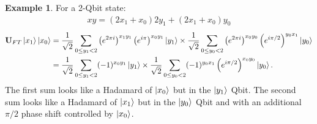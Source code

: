 \documentclass{book}
\theoremstyle{definition}
\newtheorem{exmp}{Example}[section]
\newcommand{\nn}{\nonumber}
\newcommand{\f}[2]{\frac{#1}{#2}}
\newcommand{\lp}{\left(}
\newcommand{\rp}{\right)}
\newcommand{\U}{\mathbf{U}}
\begin{document}
\begin{exmp}
	For a 2-Qbit state:
	\begin{align}
	xy = (2x_1 + x_0)2y_1 + (2x_1 + x_0)y_0
	\end{align}
	\begin{align}
	\U_{FT}\ket{x_1}\ket{x_0} &= \f{1}{\sqrt{2}}\sum_{0 \leq y_1 < 2}\lp e^{2\pi i } \rp^{x_1y_1}\lp e^{i\pi } \rp^{x_0 y_1}\ket{y_1} \times \f{1}{\sqrt{2}}\sum_{0 \leq y_0 < 2}\lp e^{2\pi i } \rp^{x_0y_0}\lp e^{i\pi/2 } \rp^{y_0 x_1}\ket{y_0}\nn\\
	&= \f{1}{\sqrt{2}}\sum_{0 \leq y_1 < 2}(-1)^{x_0 y_1}\ket{y_1} \times \f{1}{\sqrt{2}}\sum_{0 \leq y_0 < 2} (-1)^{y_0 x_1}\lp e^{i\pi/2} \rp^{x_0 y_0} \ket{y_0}.
	\end{align}
	The first sum looks like a Hadamard of $\ket{x_0}$ but in the $\ket{y_1}$ Qbit. The second sum looks like a Hadamard of $\ket{x_1}$ but in the $\ket{y_0}$ Qbit and with an additional $\pi/2$ phase shift controlled by $\ket{x_0}$. \\
	

\end{exmp}
\end{document}

